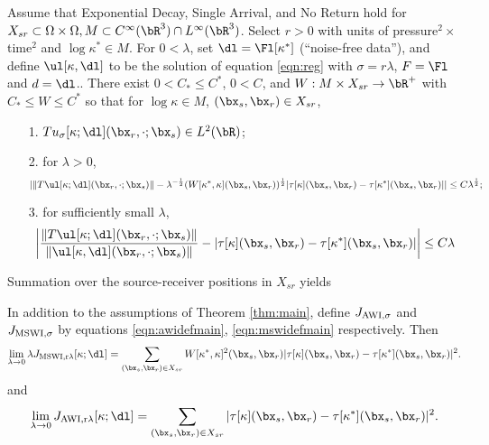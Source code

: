 \begin{theorem}
  \label{thm:main}
  Assume that Exponential Decay, Single Arrival, and No Return
  hold for $X_{sr} \subset \Omega \times \Omega, M \subset C^{\infty}(\bR^3) \cap L^{\infty}(\bR^3)$.
  Select $r >0$ with units of
  pressure$^2 \times$time$^2$ and $\log \kappa^* \in M$. For $0 <
  \lambda $, set
  $\dl=\Fl[\kappa^*]$ (``noise-free data''), and  define $\ul[\kappa,\dl]$
  to be the solution of 
  equation \ref{eqn:reg} with  $\sigma=r\lambda$, $F=\Fl$ and $d=\dl$..
  There exist $0 < C_* \le C^*$, $0 < C$, and $W: M \times X_{sr}
  \rightarrow \bR^+$ with $C_* \le
  W \le C^*$ so that for
  $\log \kappa \in M$, $(\bx_s,\bx_r) \in X_{sr}$,
  \begin{itemize}
  \item[1. ] $Tu_{\sigma}[\kappa;\dl](\bx_r,\cdot;\bx_s) \in
    L^2(\bR)$;
  \item[2. ] for $\lambda > 0$,
    \begin{equation}
      \label{eqn:mswitt}
      |\|T\ul[\kappa;\dl](\bx_r,\cdot;\bx_s)\|- \lambda^{-\frac{1}{2}} (W[\kappa^*,\kappa](\bx_s,\bx_r))^{\frac{1}{2}}|\tau[\kappa](\bx_s,\bx_r)-\tau[\kappa^*](\bx_s,\bx_r)|| \le C
      \lambda^{\frac{1}{2}};
    \end{equation}
  \item[3. ]for sufficiently small $\lambda$, 
    \begin{equation}
      \label{eqn:awitt}
      \left|\frac{\|T\ul[\kappa;\dl](\bx_r,\cdot;\bx_s)\|}{\|\ul[\kappa,\dl](\bx_r,\cdot;\bx_s)\|}-
        |\tau[\kappa](\bx_s,\bx_r)-\tau[\kappa^*](\bx_s,\bx_r)|\right| \le C \lambda
    \end{equation}
  \end{itemize}
\end{theorem}

Summation over the source-receiver positions in $X_{sr}$ yields
\begin{cor}
  \label{thm:cor1}
  In addition to the assumptions of Theorem \ref{thm:main}, define $J_{\rm
    AWI,\sigma}$ and $J_{\rm MSWI,\sigma}$ by equations
  \ref{eqn:awidefmain}, \ref{eqn:mswidefmain} respectively. Then
\begin{equation}
\label{eqn:cor1mswi}   
\lim_{\lambda \rightarrow 0} \lambda J_{\rm MSWI,r\lambda}[\kappa;\dl]
= \sum_{(\bx_s,\bx_r) \in X_{sr}} W[\kappa^*,\kappa]^2(\bx_s,\bx_r) |\tau[\kappa](\bx_s,\bx_r) - \tau[\kappa^*](\bx_s,\bx_r)|^2.
\end{equation}
and
\begin{equation}
\label{eqn:cor1awi}   
\lim_{\lambda \rightarrow 0} J_{\rm AWI,r\lambda}[\kappa;\dl]
= \sum_{(\bx_s,\bx_r) \in X_{sr}}  |\tau[\kappa](\bx_s,\bx_r) - \tau[\kappa^*](\bx_s,\bx_r)|^2.
\end{equation}
\end{cor}

